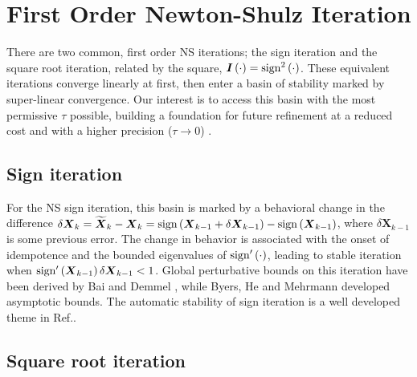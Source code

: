 \documentclass[letterpaper,twocolumn,amsmath,amsfont,amssymb,english,aps,jcp,preprintnumbers,groupaddress,nofootinbib,tightenlines]{revtex4}
\newcommand{\mat}[1]{\boldsymbol{#1}}
\begin{document}
\section{First Order Newton-Shulz Iteration}

There are two common, first order NS iterations; the sign iteration
and the square root iteration, related by the square, $\mat{I}\left(
\cdot \right)= {\rm sign}^2\left( \cdot \right) $.  These equivalent
iterations converge linearly at first, then enter a basin of stability
marked by super-linear convergence.  Our interest is to access this
basin with the most permissive $\tau$ possible, building a foundation
for future refinement
at a reduced cost and with a higher precision ($\tau \rightarrow 0$)
\cite{MChallacombe16}.

\subsection{Sign iteration}

For the NS sign iteration, this basin is marked by a behavioral change
in the difference $\delta \mat{X}_k = \widetilde{\mat{X}}_k -\mat{X}_k
= {\rm sign} \left(\mat{X}_{k-1}+\delta \mat{X}_{k-1} \right) -{\rm
  sign} \left(\mat{X}_{k-1} \right)$, where $\delta \mat{X}_{k-1}$ is
some previous error.  The change in behavior is associated with the
onset of idempotence and the bounded eigenvalues of ${\rm sign}'\left(
\cdot \right)$, leading to stable iteration when ${\rm sign}'\left(
\mat{X}_{k-1} \right) \delta \mat{X}_{k-1} < 1 $.  Global perturbative
bounds on this iteration have been derived by Bai and Demmel
\cite{Bai98usingthe}, while Byers, He and Mehrmann \cite{} developed
asymptotic bounds.  The automatic stability of sign iteration is a
well developed theme in Ref.\cite{Higham08}.

\subsection{Square root iteration}
\end{document}
